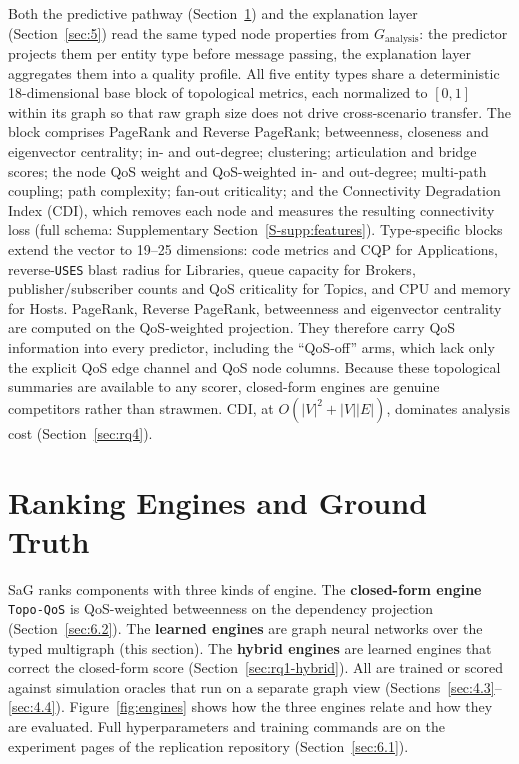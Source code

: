 \documentclass[preprint,3p]{elsarticle}
\begin{document}
Both the predictive pathway (Section~\ref{sec:4}) and the explanation layer (Section~\ref{sec:5}) read the same typed node properties from $G_{\text{analysis}}$: the predictor projects them per entity type before message passing, the explanation layer aggregates them into a quality profile. All five entity types share a deterministic 18-dimensional base block of topological metrics, each normalized to $[0, 1]$ within its graph so that raw graph size does not drive cross-scenario transfer. The block comprises PageRank and Reverse PageRank; betweenness, closeness and eigenvector centrality; in- and out-degree; clustering; articulation and bridge scores; the node QoS weight and QoS-weighted in- and out-degree; multi-path coupling; path complexity; fan-out criticality; and the Connectivity Degradation Index (CDI), which removes each node and measures the resulting connectivity loss (full schema: Supplementary Section~\ref{S-supp:features}). Type-specific blocks extend the vector to 19--25 dimensions: code metrics and CQP for Applications, reverse-\texttt{USES} blast radius for Libraries, queue capacity for Brokers, publisher/subscriber counts and QoS criticality for Topics, and CPU and memory for Hosts. PageRank, Reverse PageRank, betweenness and eigenvector centrality are computed on the QoS-weighted projection. They therefore carry QoS information into every predictor, including the ``QoS-off'' arms, which lack only the explicit QoS edge channel and QoS node columns. Because these topological summaries are available to any scorer, closed-form engines are genuine competitors rather than strawmen. CDI, at $O(|V|^2 + |V||E|)$, dominates analysis cost (Section~\ref{sec:rq4}).

\section{Ranking Engines and Ground Truth}
\label{sec:4}

SaG ranks components with three kinds of engine. The \textbf{closed-form engine} \texttt{Topo-QoS} is QoS-weighted betweenness on the dependency projection (Section~\ref{sec:6.2}). The \textbf{learned engines} are graph neural networks over the typed multigraph (this section). The \textbf{hybrid engines} are learned engines that correct the closed-form score (Section~\ref{sec:rq1-hybrid}). All are trained or scored against simulation oracles that run on a separate graph view (Sections~\ref{sec:4.3}--\ref{sec:4.4}). Figure~\ref{fig:engines} shows how the three engines relate and how they are evaluated. Full hyperparameters and training commands are on the experiment pages of the replication repository (Section~\ref{sec:6.1}).
\end{document}
